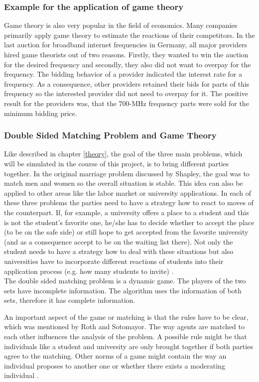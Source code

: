 \subsubsection{Example for the application of game theory}
Game theory is also very popular in the field of economics.
Many companies primarily apply game theory to estimate the reactions of their competitors. 
In the last auction for broadband internet frequencies in Germany, all major providers hired game theorists out of two reasons. 
Firstly, they wanted to win the auction for the desired frequency and secondly, they also did not want to overpay for the frequency.
The bidding behavior of a provider indicated the interest rate for a frequency. 
As a consequence, other providers retained their bids for parts of this frequency so the interested provider did not need to overpay for it. 
The positive result for the providers was, that the 700-MHz frequency parts were sold for the minimum bidding price. \cite{gametheoryWelt}

\subsubsection{Double Sided Matching Problem and Game Theory}

Like described in chapter \ref{theory}, the goal of the three main problems, which will be simulated in the course of this project, is to bring different parties together.
In the original marriage problem discussed by Shapley, the goal was to match men and women so the overall situation is stable.
This idea can also be applied to other areas like the labor market or university applications.
In each of these three problems the parties need to have a strategy how to react to moves of the counterpart.
If, for example, a university offers a place to a student and this is not the student's favorite one, he/she has to decide whether to accept the place (to be on the safe side) or still hope to get accepted from the favorite university (and as a consequence accept to be on the waiting list there).
Not only the student needs to have a strategy how to deal with these situations but also universities have to incorporate different reactions of students into their application process (e.g. how many students to invite) \cite{gale62a}. \\
The double sided matching problem is a dynamic game.
The players of the two sets have incomplete information.
The algorithm uses the information of both sets, therefore it has complete information.

An important aspect of the game or matching is that the rules have to be clear, which was mentioned by Roth and Sotomayor.
The way agents are matched to each other influences the analysis of the problem.
A possible rule might be that individuals like a student and university are only brought together if both parties agree to the matching.
Other norms of a game might contain the way an individual proposes to another one or whether there exists a moderating individual \cite[p. 492]{roth1992two}.